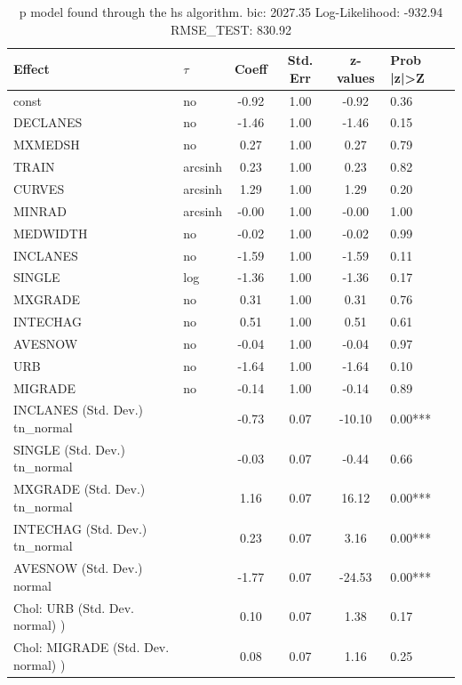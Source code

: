 \begin{table}
	\caption{p model found through the hs algorithm. bic: 2027.35 Log-Likelihood: -932.94 RMSE_TEST: 830.92}
	\begin{center}
		\begin{tabular}{|l|l|c|c|c|l|}
			\hline
			Effect & $\tau$ & Coeff & Std. Err & z-values & Prob |z|>Z \\
			\hline
			const & no & -0.92 & 1.00 & -0.92 & 0.36 \\
			\hline
			DECLANES & no & -1.46 & 1.00 & -1.46 & 0.15 \\
			\hline
			MXMEDSH & no & 0.27 & 1.00 & 0.27 & 0.79 \\
			\hline
			TRAIN & arcsinh & 0.23 & 1.00 & 0.23 & 0.82 \\
			\hline
			CURVES & arcsinh & 1.29 & 1.00 & 1.29 & 0.20 \\
			\hline
			MINRAD & arcsinh & -0.00 & 1.00 & -0.00 & 1.00 \\
			\hline
			MEDWIDTH & no & -0.02 & 1.00 & -0.02 & 0.99 \\
			\hline
			INCLANES & no & -1.59 & 1.00 & -1.59 & 0.11 \\
			\hline
			SINGLE & log & -1.36 & 1.00 & -1.36 & 0.17 \\
			\hline
			MXGRADE & no & 0.31 & 1.00 & 0.31 & 0.76 \\
			\hline
			INTECHAG & no & 0.51 & 1.00 & 0.51 & 0.61 \\
			\hline
			AVESNOW & no & -0.04 & 1.00 & -0.04 & 0.97 \\
			\hline
			URB & no & -1.64 & 1.00 & -1.64 & 0.10 \\
			\hline
			MIGRADE & no & -0.14 & 1.00 & -0.14 & 0.89 \\
			\hline
			INCLANES (Std. Dev.) tn_normal &  & -0.73 & 0.07 & -10.10 & 0.00*** \\
			\hline
			SINGLE (Std. Dev.) tn_normal &  & -0.03 & 0.07 & -0.44 & 0.66 \\
			\hline
			MXGRADE (Std. Dev.) tn_normal &  & 1.16 & 0.07 & 16.12 & 0.00*** \\
			\hline
			INTECHAG (Std. Dev.) tn_normal &  & 0.23 & 0.07 & 3.16 & 0.00*** \\
			\hline
			AVESNOW (Std. Dev.) normal &  & -1.77 & 0.07 & -24.53 & 0.00*** \\
			\hline
			 Chol: URB (Std. Dev. normal) ) &  & 0.10 & 0.07 & 1.38 & 0.17 \\
			\hline
			 Chol: MIGRADE (Std. Dev. normal) ) &  & 0.08 & 0.07 & 1.16 & 0.25 \\

\end{tabular}
\end{center}
\end{table}
